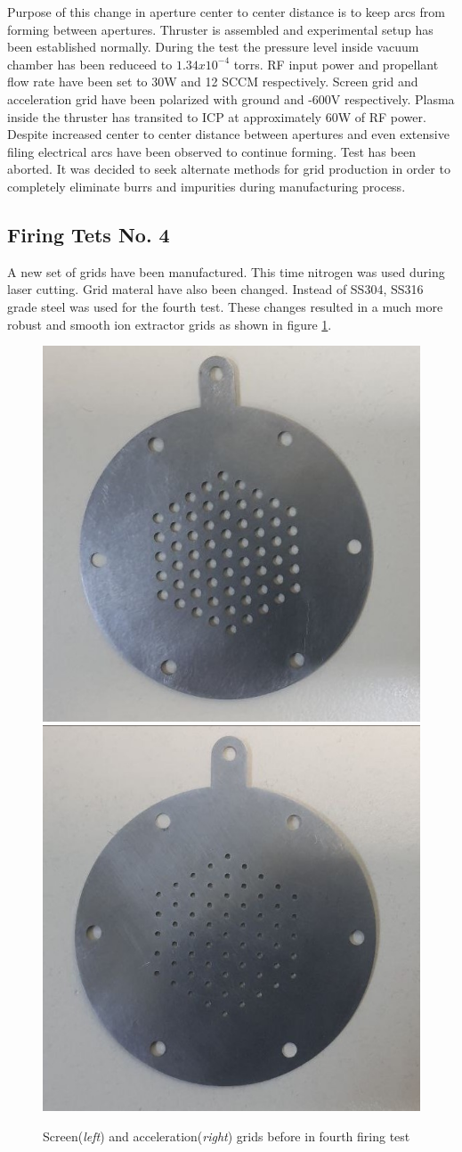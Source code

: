 Purpose of this change in aperture center to center distance is to keep arcs from forming between apertures. Thruster is assembled and experimental setup has been established normally. During the test the pressure level inside vacuum chamber has been reduceed to $1.34x10^{-4}$ torrs. RF input power and propellant flow rate have been set to 30W and 12 SCCM respectively.     
Screen grid and acceleration grid have been polarized with ground and -600V respectively. Plasma inside the thruster has transited to ICP at approximately 60W of RF power. 
Despite increased center to center distance between apertures and even extensive filing electrical arcs have been observed to continue forming. Test has been aborted. It was decided to seek alternate methods for grid production in order to completely eliminate burrs and impurities during manufacturing process. 
\newpage
\subsection{Firing Tets No. 4}
A new set of grids have been manufactured. This time nitrogen was used during laser cutting. Grid materal have also been changed. Instead of SS304, SS316 grade steel was used for the fourth test. These changes resulted in a much more robust and smooth ion extractor grids as shown in figure \ref{fig:4th_grids_before}. 

\begin{figure}[ht]
    \centering
    \includegraphics[width=0.41\linewidth]{fig/deneme4/test4_screen_before.jpg}
    \includegraphics[width=0.4\linewidth]{fig/deneme4/test4_accel_before.jpg}
    \caption{Screen(\textit{left}) and acceleration(\textit{right}) grids before in fourth firing test}
    \label{fig:4th_grids_before}
\end{figure}


